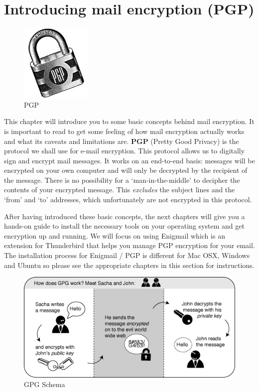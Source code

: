\section{Introducing mail encryption (PGP)}

\begin{figure}[htbp]
\centering
\includegraphics{pgp.jpg}
\caption{PGP}
\end{figure}

This chapter will introduce you to some basic concepts behind mail
encryption. It is important to read to get some feeling of how mail
encryption actually works and what its caveats and limitations are.
\textbf{PGP} (Pretty Good Privacy) is the protocol we shall use for
e-mail encryption. This protocol allows us to digitally sign and encrypt
mail messages. It works on an end-to-end basis: messages will be
encrypted on your own computer and will only be decrypted by the
recipient of the message. There is no possibility for a
`man-in-the-middle' to decipher the contents of your encrypted message.
This \emph{excludes} the subject lines and the `from' and `to'
addresses, which unfortunately are not encrypted in this protocol.

After having introduced these basic concepts, the next chapters will
give you a hands-on guide to install the necessary tools on your
operating system and get encryption up and running. We will focus on
using Enigmail which is an extension for Thunderbird that helps you
manage PGP encryption for your email. The installation process for
Enigmail / PGP is different for Mac OSX, Windows and Ubuntu so please
see the appropriate chapters in this section for instructions.

\begin{figure}[htbp]
\centering
\includegraphics{gpg-schema.jpg}
\caption{GPG Schema}
\end{figure}

